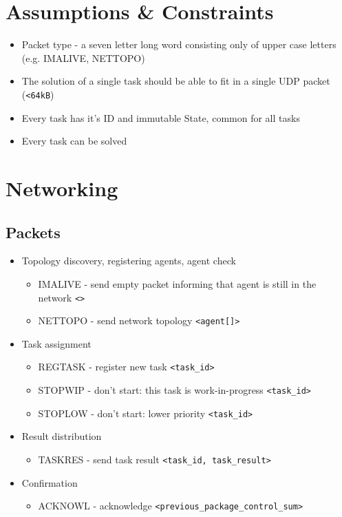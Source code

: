 \documentclass{article}
\begin{document}
\section{Assumptions \& Constraints}
\begin{itemize}
    \item Packet type - a seven letter long word consisting only of upper case letters (e.g. IMALIVE, NETTOPO)
    \item The solution of a single task should be able to fit in a single UDP packet (\verb!<64kB!)
    \item Every task has it's ID and immutable State, common for all tasks
    \item Every task can be solved
\end{itemize}

\section{Networking}
\subsection{Packets}

\begin{itemize}
    \item Topology discovery, registering agents, agent check
    \begin{itemize}
        \item IMALIVE - send empty packet informing that agent is still in the network \verb!<>!
        \item NETTOPO - send network topology \verb!<agent[]>!
    \end{itemize}
    \item Task assignment
    \begin{itemize}
        \item REGTASK - register new task \verb!<task_id>!
        \item STOPWIP - don't start: this task is work-in-progress \verb!<task_id>!
        \item STOPLOW - don't start: lower priority \verb!<task_id>!
    \end{itemize}
    \item Result distribution
    \begin{itemize}
        \item TASKRES - send task result \verb!<task_id, task_result>!
    \end{itemize}
    \item Confirmation
    \begin{itemize}
        \item ACKNOWL - acknowledge \verb!<previous_package_control_sum>!
    \end{itemize}
\end{itemize}
\end{document}
